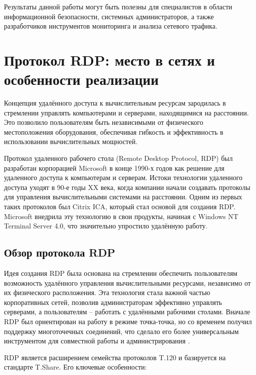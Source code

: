 \documentclass[bachelor, och, coursework]{SCWorks}
\begin{document}
Результаты данной работы могут быть полезны для специалистов в области информационной безопасности, системных администраторов, а также 
разработчиков инструментов мониторинга и анализа сетевого трафика.

\section{Протокол RDP: место в сетях и особенности реализации}

Концепция удалённого доступа к вычислительным ресурсам зародилась в стремлении управлять компьютерами и серверами, находящимися на расстоянии. 
Это позволило пользователям быть независимыми от физического местоположения оборудования, обеспечивая гибкость и эффективность в использовании 
вычислительных мощностей.

Протокол удаленного рабочего стола (Remote Desktop Protocol, RDP) был разработан корпорацией Microsoft в конце 1990-х годов как решение для 
удаленного доступа к компьютерам и серверам. Истоки технологии удаленного доступа уходят в 90-е годы XX века, когда компании начали создавать 
протоколы для управления вычислительными системами на расстоянии. Одним из первых таких протоколов был Citrix ICA, который стал основой для 
создания RDP. Microsoft внедрила эту технологию в свои продукты, начиная с Windows NT Terminal Server 4.0, что значительно упростило удалённую работу.

\subsection{Обзор протокола RDP}

Идея создания RDP была основана на стремлении обеспечить пользователям возможность удалённого управления вычислительными ресурсами, независимо от 
их физического расположения. Эта технология стала важной частью корпоративных сетей, позволив администраторам эффективно управлять серверами, а 
пользователям -- работать с удалёнными рабочими столами. Вначале RDP был ориентирован на работу в режиме точка-точка, но со временем получил 
поддержку многоточечных соединений, что сделало его более универсальным инструментом для совместной работы и администрирования \cite{rdp22}.

RDP является расширением семейства протоколов T.120 и базируется на стандарте T.Share. Его ключевые особенности:
\end{document}
